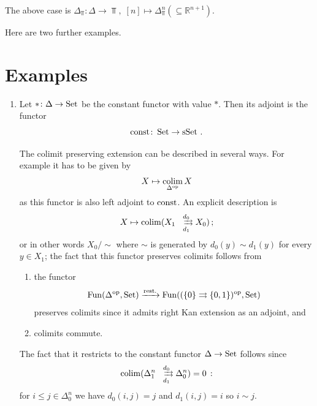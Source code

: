         The above case is $\Delta_{\Top} \colon \Delta \to \Top, \; [n] \mapsto \Delta^n_{\Top} (\subseteq \mathbb{R}^{n+1})$.
        \medskip

        Here are two further examples.
    \section{Examples}\label{chII-19}
        \begin{enumerate}[label=\roman*)]
            \item 
                Let $* \colon \Delta \to \operatorname{Set}$ be the constant functor with value $*$. Then its adjoint is the functor
                \begin{equation*}
                    \operatorname{const} \colon \operatorname{Set} \to \operatorname{sSet} \,.
                \end{equation*}

                The colimit preserving extension can be described in several ways. For example it has to be given by
                \begin{equation*}
                    X \mapsto \operatorname*{colim}\limits_{\Delta^{\operatorname{op}}}X
                \end{equation*}
                as this functor is also left adjoint to $\operatorname{const}$. An explicit description is
                \begin{equation*}
                    X \mapsto \colim(X_1 \xrightrightarrows[d_1]{d_0} X_0) \,;
                \end{equation*}
                or in other words ${X_0}/{\sim}$ where $\sim$ is generated by $d_0(y) \sim d_1(y)$ for every $y \in X_1$; the fact that this functor preserves colimits follows from
                \begin{enumerate}[label=\roman*)]
                    \item 
                        the functor
                        \begin{equation*}
                            \operatorname{Fun}(\Delta^{\operatorname{op}}, \operatorname{Set}) \xrightarrow{\text{rest.}} \operatorname{Fun}((\left\{ 0 \right\} \rightrightarrows \left\{ 0, 1 \right\})^{\operatorname{op}}, \operatorname{Set})
                        \end{equation*}
                        preserves colimits since it admits right Kan extension as an adjoint, and
                    \item 
                        colimits commute.  
                \end{enumerate}
                The fact that it restricts to the constant functor $\Delta \to \operatorname{Set}$ follows since
                \begin{equation*}
                    \colim (\Delta^n_1 \xrightrightarrows[d_1]{d_0} \Delta^n_0) = 0 \,:
                \end{equation*}
                for $i \leq j \in \Delta^n_0$ we have $d_0(i, j) = j$ and $d_1(i, j) = i$ so $i \sim j$.
        \end{enumerate}
